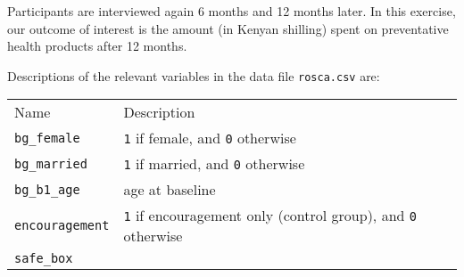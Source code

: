 \documentclass[]{article}
\begin{document}
Participants are interviewed again 6 months and 12 months later. In this
exercise, our outcome of interest is the amount (in Kenyan shilling)
spent on preventative health products after 12 months.

Descriptions of the relevant variables in the data file
\texttt{rosca.csv} are:

\begin{longtable}[c]{@{}ll@{}}
\toprule\addlinespace
\begin{minipage}[b]{0.34\columnwidth}\raggedright
Name
\end{minipage} & \begin{minipage}[b]{0.59\columnwidth}\raggedright
Description
\end{minipage}
\\\addlinespace
\midrule\endhead
\begin{minipage}[t]{0.34\columnwidth}\raggedright
\texttt{bg\_female}
\end{minipage} & \begin{minipage}[t]{0.59\columnwidth}\raggedright
\texttt{1} if female, and \texttt{0} otherwise
\end{minipage}
\\\addlinespace
\begin{minipage}[t]{0.34\columnwidth}\raggedright
\texttt{bg\_married}
\end{minipage} & \begin{minipage}[t]{0.59\columnwidth}\raggedright
\texttt{1} if married, and \texttt{0} otherwise
\end{minipage}
\\\addlinespace
\begin{minipage}[t]{0.34\columnwidth}\raggedright
\texttt{bg\_b1\_age}
\end{minipage} & \begin{minipage}[t]{0.59\columnwidth}\raggedright
age at baseline
\end{minipage}
\\\addlinespace
\begin{minipage}[t]{0.34\columnwidth}\raggedright
\texttt{encouragement}
\end{minipage} & \begin{minipage}[t]{0.59\columnwidth}\raggedright
\texttt{1} if encouragement only (control group), and \texttt{0}
otherwise
\end{minipage}
\\\addlinespace
\begin{minipage}[t]{0.34\columnwidth}\raggedright
\texttt{safe\_box}

\end{minipage}
\end{longtable}
\end{document}
